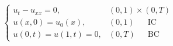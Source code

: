 \vspace{-0.75em}
$$
    \begin{cases}
        u_t - u_{xx} = 0,  &  (0,1) \times (0,T)\\
        u(x,0) = u_0(x), &  (0,1) \phantom{T} \quad \textrm{IC}\\
        u(0,t) = u(1,t) = 0, &  (0,T) \phantom{1} \quad \textrm{BC}
    \end{cases}
$$
\vspace{-0.5em}

